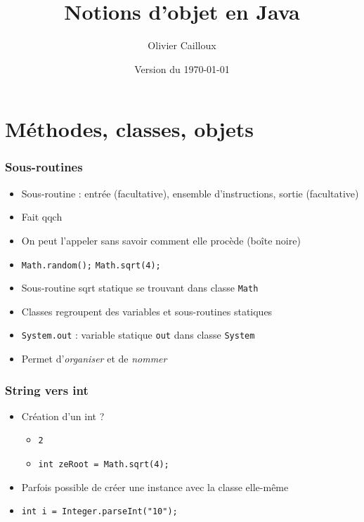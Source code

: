 \documentclass[english, french]{beamer}
\title{Notions d’objet en Java}
\subtitle{}
\author{Olivier Cailloux}
\institute[LAMSADE]{LAMSADE, Université Paris-Dauphine}
\date{Version du \today}
\begin{document}


\begin{frame}[plain]
   \titlepage
\end{frame}
\addtocounter{framenumber}{-1}

\section{Méthodes, classes, objets}
\begin{frame}
	\frametitle{Sous-routines}
	\begin{itemize}
		\item Sous-routine : entrée (facultative), ensemble d’instructions, sortie (facultative)
		\item Fait qqch
		\item On peut l’appeler sans savoir comment elle procède (boîte noire)
		\item \texttt{Math.random();} \texttt{Math.sqrt(4);}
		\item Sous-routine sqrt statique se trouvant dans classe \texttt{Math}
		\item Classes regroupent des variables et sous-routines statiques
		\item \texttt{System.out} : variable statique \texttt{out} dans classe \texttt{System}
		\item Permet d’\emph{organiser} et de \emph{nommer}
	\end{itemize}
\end{frame}

\begin{frame}
	\frametitle{String vers int}
	\begin{itemize}
		\item Création d’un int ? \pause
		\begin{itemize}
			\item \texttt{2}
			\item \texttt{int zeRoot = Math.sqrt(4);} \pause
		\end{itemize}
		\item Parfois possible de créer une instance avec la classe elle-même
		\item \texttt{int i = Integer.parseInt("10");}
	\end{itemize}
\end{frame}
\end{document}
